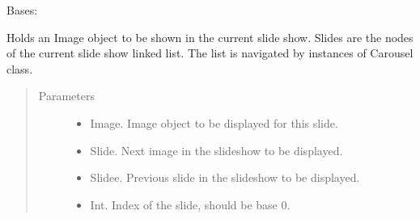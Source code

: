 \documentclass[letterpaper,10pt,english]{sphinxmanual}
\begin{document}
\begin{fulllineitems}
\label{\detokenize{polo.widgets:polo.widgets.slideshow_viewer.Slide}}
Bases: 

Holds an Image object to be shown in the current slide show. Slides are
the nodes of the current slide show linked list. The list is navigated by
instances of Carousel class.
\begin{quote}\begin{description}
\item[{Parameters}] \leavevmode\begin{itemize}
\item {} 
 \textendash{} Image. Image object to be displayed for this slide.

\item {} 
 \textendash{} Slide. Next image in the slideshow to be displayed.

\item {} 
 \textendash{} Slidee. Previous slide in the slideshow to be displayed.

\item {} 
 \textendash{} Int. Index of the slide, should be base 0.

\end{itemize}

\end{description}\end{quote}

\end{fulllineitems}

\end{document}

